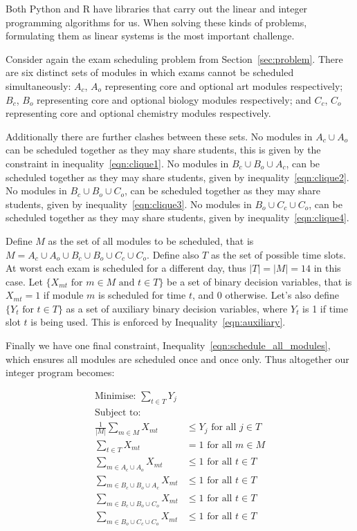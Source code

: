 Both Python and R have libraries that carry out the linear and integer
programming algorithms for us. When solving these kinds of problems, formulating
them as linear systems is the most important challenge.

Consider again the exam scheduling problem from Section~\ref{sec:problem}.
There are six distinct sets of modules in which exams cannot be scheduled
simultaneously: $A_c$, $A_o$ representing core and optional art modules
respectively; $B_c$, $B_o$ representing core and optional biology modules
respectively; and $C_c$, $C_o$ representing core and optional chemistry modules
respectively.

Additionally there are further clashes between these sets.
No modules in $A_c \cup A_o$ can be scheduled together as they may share
students, this is given by the constraint in inequality~\ref{eqn:clique1}.
No modules in $B_c \cup B_o \cup A_c$, can be scheduled together as they may
share students, given by inequality~\ref{eqn:clique2}.
No modules in $B_c \cup B_o \cup C_o$, can be scheduled together as they may
share students, given by inequality~\ref{eqn:clique3}.
No modules in $B_o \cup C_c \cup C_o$, can be scheduled together as they may
share students, given by inequality~\ref{eqn:clique4}.

Define $M$ as the set of all modules to be scheduled, that is
$M = A_c \cup A_o \cup B_c \cup B_o \cup C_c \cup C_o$.
Define also $T$ as the set of possible time slots. At worst each exam is
scheduled for a different day, thus $|T| = |M| = 14$ in this case.
Let $\{X_{mt} \text{ for } m \in M \text{ and } t \in T\}$ be a set of binary
decision variables, that is $X_{mt} = 1$ if module $m$ is scheduled for time
$t$, and $0$ otherwise.
Let's also define $\{Y_t \text{ for } t \in T\}$ as a set of auxiliary binary
decision variables, where $Y_t$ is 1 if time slot $t$ is being used. This is
enforced by Inequality~\ref{eqn:auxiliary}.

Finally we have one final constraint, Inequality~\ref{eqn:schedule_all_modules},
which ensures all modules are scheduled once and once only.
Thus altogether our integer program becomes:

\begin{align}
\text{Minimise: } \sum_{t \in T} Y_j & \\\label{eqn:objective}
\text{Subject to: } & \nonumber \\
\frac{1}{|M|} \sum_{m \in M} X_{mt} &\leq Y_j \text{ for all } j \in T\\\label{eqn:auxiliary}
\sum_{t \in T} X_{mt} &= 1 \text{ for all } m \in M\\\label{eqn:schedule_all_modules}
\sum_{m \in A_c \cup A_o} X_{mt} &\leq 1 \text{ for all } t \in T\\\label{eqn:clique1}
\sum_{m \in B_c \cup B_o \cup A_c} X_{mt} &\leq 1 \text{ for all } t \in T\\\label{eqn:clique2}
\sum_{m \in B_c \cup B_o \cup C_o} X_{mt} &\leq 1 \text{ for all } t \in T\\\label{eqn:clique3}
\sum_{m \in B_o \cup C_c \cup C_o} X_{mt} &\leq 1 \text{ for all } t \in T\\\label{eqn:clique4}
\end{align}


